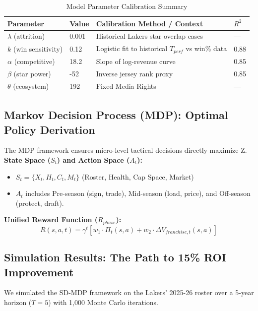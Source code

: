 \documentclass[12pt]{article}
\begin{document}
\begin{table}[H]
\centering
\caption{Model Parameter Calibration Summary}
\begin{tabular}{llll}
\toprule
\textbf{Parameter} & \textbf{Value} & \textbf{Calibration Method / Context} & \textbf{$R^2$} \\
\midrule
$\lambda$ (attrition) & 0.001 & Historical Lakers star overlap cases & — \\
$k$ (win sensitivity) & 0.12 & Logistic fit to historical $T_{perf}$ vs win\% data & 0.88 \\
$\alpha$ (competitive) & 18.2 & Slope of log-revenue curve & 0.85 \\
$\beta$ (star power) & -52 & Inverse jersey rank proxy & 0.85 \\
$\theta$ (ecosystem) & 192 & Fixed Media Rights & — \\
\bottomrule
\end{tabular}
\end{table}

\subsection{Markov Decision Process (MDP): Optimal Policy Derivation}
The MDP framework ensures micro-level tactical decisions directly maximize Z.
\textbf{State Space ($S_t$) and Action Space ($A_t$):}
\begin{itemize}
    \item $S_t = \{X_t, H_t, C_t, M_t\}$ (Roster, Health, Cap Space, Market)
    \item $A_t$ includes Pre-season (sign, trade), Mid-season (load, price), and Off-season (protect, draft).
\end{itemize}

\textbf{Unified Reward Function ($R_{phase}$):}
\begin{equation}
R(s, a, t) = \gamma^t [w_1 \cdot \Pi_t(s, a) + w_2 \cdot \Delta V_{franchise,t}(s, a)]
\end{equation}

\subsection{Simulation Results: The Path to 15\% ROI Improvement}
We simulated the SD-MDP framework on the Lakers' 2025-26 roster over a 5-year horizon ($T = 5$) with 1,000 Monte Carlo iterations.
\end{document}
